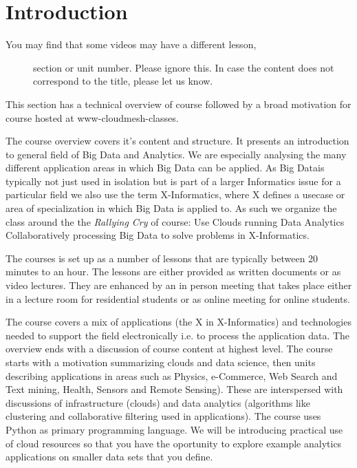 \FILENAME

\section{Introduction}\label{introduction}

\begin{description}
\item[You may find that some videos may have a different lesson,]
section or unit number. Please ignore this. In case the content does not
correspond to the title, please let us know.
\end{description}

This section has a technical overview of course followed by a broad
motivation for course hosted at www-cloudmesh-classes.

The course overview covers it's content and structure. It presents an
introduction to general field of Big Data and Analytics. We are
especially analysing the many different application areas in which Big
Data can be applied. As Big Datais typically not just used in isolation
but is part of a larger Informatics issue for a particular field we also
use the term X-Informatics, where X defines a usecase or area of
specialization in which Big Data is applied to. As such we organize the
class around the the \emph{Rallying Cry} of course: Use Clouds running
Data Analytics Collaboratively processing Big Data to solve problems in
X-Informatics.

The courses is set up as a number of lessons that are typically between
20 minutes to an hour. The lessons are either provided as written
documents or as video lectures. They are enhanced by an in person
meeting that takes place either in a lecture room for residential
students or as online meeting for online students.

The course covers a mix of applications (the X in X-Informatics) and
technologies needed to support the field electronically i.e. to process
the application data. The overview ends with a discussion of course
content at highest level. The course starts with a motivation
summarizing clouds and data science, then units describing applications
in areas such as Physics, e-Commerce, Web Search and Text mining,
Health, Sensors and Remote Sensing). These are interspersed with
discussions of infrastructure (clouds) and data analytics (algorithms
like clustering and collaborative filtering used in applications). The
course uses Python as primary programming language. We will be
introducing practical use of cloud resources so that you have the
oportunity to explore example analytics applications on smaller data
sets that you define.

